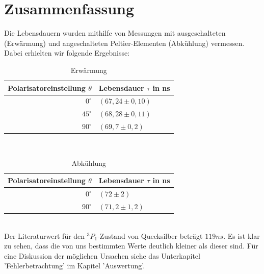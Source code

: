 \section{Zusammenfassung}
Die Lebensdauern wurden mithilfe von Messungen mit ausgeschalteten (Erwärmung) und angeschalteten Peltier-Elementen (Abkühlung) vermessen. Dabei erhielten wir folgende Ergebnisse:\\
\begin{table}[htbp]
\begin{center}
\caption{Erwärmung}
\begin{tabular}{|r|l|}
\hline
\multicolumn{1}{|l|}{Polarisatoreinstellung $\theta$} & Lebensdauer $\tau$ in ns \\ \hline
$0^{\circ}$ & $(67,24\pm0,10)$ \\ \hline
$45^{\circ}$ & $(68,28\pm0,11)$ \\ \hline
$90^{\circ}$ & $(69,7\pm0,2)$ \\ \hline
\end{tabular}
\end{center}
\label{}
\end{table}
~\\
\begin{table}[htbp]
\begin{center}
\caption{Abkühlung}
\begin{tabular}{|r|l|}
\hline
\multicolumn{1}{|l|}{Polarisatoreinstellung $\theta$} & Lebensdauer $\tau$ in ns \\ \hline
$0^{\circ}$ & $(72\pm2)$ \\ \hline
$90^{\circ}$ & $(71,2\pm1,2)$ \\ \hline
\end{tabular}
\end{center}
\label{}
\end{table}
~\\
Der Literaturwert für den $^{3}P_{1}$-Zustand von Quecksilber beträgt $119 ns$. Es ist klar zu sehen, dass die von uns bestimmten Werte deutlich kleiner als dieser sind. Für eine Diskussion der möglichen Ursachen siehe das Unterkapitel 'Fehlerbetrachtung' im Kapitel 'Auswertung'.
